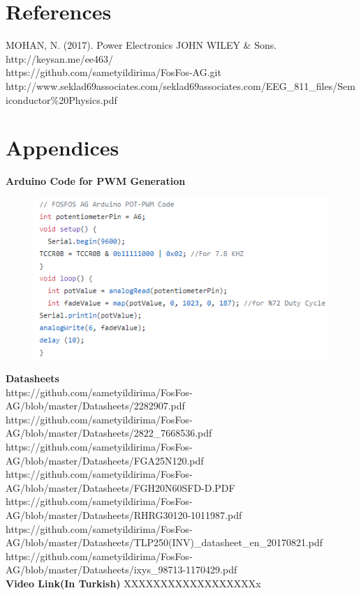 \documentclass{article}
\begin{document}
\section{References}
MOHAN, N. (2017). Power Electronics JOHN WILEY \& Sons.\\
http://keysan.me/ee463/  \\
https://github.com/sametyildirima/FosFos-AG.git\\
http://www.seklad69associates.com/seklad69associates.com/EEG\_811\_files/Semiconductor\%20Physics.pdf



\section*{Appendices}
\textbf{Arduino Code for PWM Generation} 
\begin{figure}[H]
\includegraphics[scale=0.8]{pwmcode}
\label{fig:members}
\end{figure} 
\noindent \textbf{Datasheets} \\
https://github.com/sametyildirima/FosFos-AG/blob/master/Datasheets/2282907.pdf\\
https://github.com/sametyildirima/FosFos-AG/blob/master/Datasheets/2822\_7668536.pdf\\
https://github.com/sametyildirima/FosFos-AG/blob/master/Datasheets/FGA25N120.pdf\\
https://github.com/sametyildirima/FosFos-AG/blob/master/Datasheets/FGH20N60SFD-D.PDF\\
https://github.com/sametyildirima/FosFos-AG/blob/master/Datasheets/RHRG30120-1011987.pdf\\
https://github.com/sametyildirima/FosFos-AG/blob/master/Datasheets/TLP250(INV)\_datasheet\_en\_20170821.pdf\\
https://github.com/sametyildirima/FosFos-AG/blob/master/Datasheets/ixys\_98713-1170429.pdf\\
\noindent \textbf{Video Link(In Turkish)} %
XXXXXXXXXXXXXXXXXXx
\end{document}
